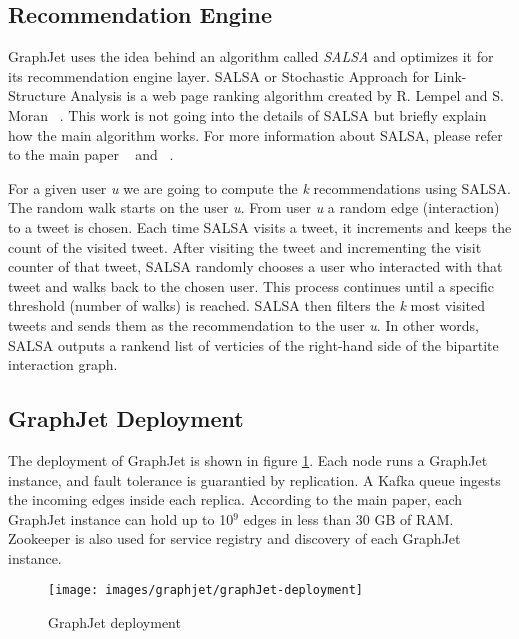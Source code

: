 \subsection{Recommendation Engine}
GraphJet uses the idea behind an algorithm called \emph{SALSA} and optimizes it for its recommendation engine layer. SALSA or Stochastic Approach for Link-Structure Analysis is a web page ranking algorithm created by R. Lempel and S. Moran ~\cite{lempel2001salsa}. This work is not going into the details of SALSA but briefly explain how the main algorithm works. For more information about SALSA, please refer to the main paper ~\cite{lempel2001salsa} and ~\cite{sharma2016graphjet}.

For a given user \textit{u} we are going to compute the \textit{k} recommendations using SALSA. The random walk starts on the user \textit{u}. From user \textit{u} a random edge (interaction) to a tweet is chosen. Each time SALSA visits a tweet, it increments and keeps the count of the visited tweet. After visiting the tweet and incrementing the visit counter of that tweet, SALSA randomly chooses a user who interacted with that tweet and walks back to the chosen user. This process continues until a specific threshold (number of walks) is reached. SALSA then filters the \textit{k} most visited tweets and sends them as the recommendation to the user \textit{u}. In other words, SALSA outputs a rankend list of verticies of the right-hand side of the bipartite interaction graph.

\subsection{GraphJet Deployment}

The deployment of GraphJet is shown in figure \ref{fig:graphJet-deployment}. Each node runs a GraphJet instance, and fault tolerance is guarantied by replication. A Kafka queue ingests the incoming edges inside each replica. According to the main paper, each GraphJet instance can hold up to 10$^9$ edges in less than 30 GB of RAM. Zookeeper is also used for service registry and discovery of each GraphJet instance.
\begin{figure}[!h]
	\centering
	\texttt{[image: images/graphjet/graphJet-deployment]}
	\caption{GraphJet deployment}
	\label{fig:graphJet-deployment}
\end{figure}

